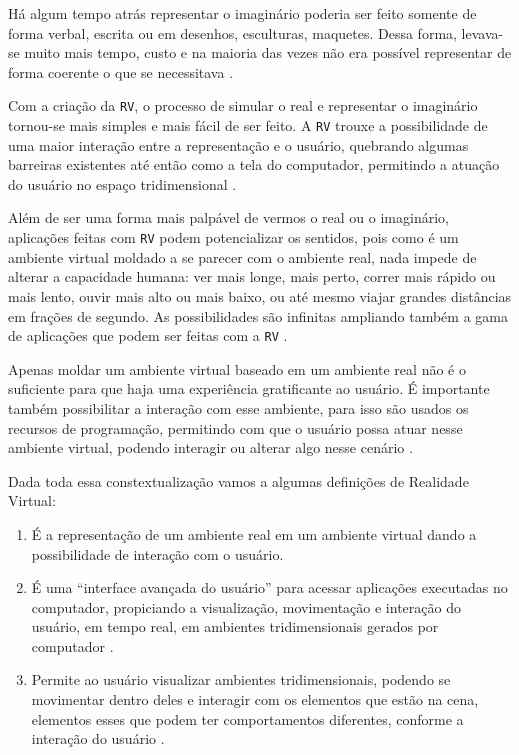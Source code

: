 Há algum tempo atrás representar o imaginário poderia ser feito somente de forma verbal, escrita ou  em
desenhos, esculturas, maquetes. Dessa forma, levava-se muito mais tempo, custo e na maioria das vezes não era
possível representar de forma coerente o que se necessitava \cite{kirner2006}.

Com a criação da \verb'RV', o processo de simular o real e representar o imaginário tornou-se mais simples e
mais fácil de ser feito. A \verb'RV' trouxe a possibilidade de uma maior interação entre a representação e o
usuário, quebrando algumas barreiras existentes até então como a tela do computador, permitindo a atuação do
usuário no espaço tridimensional \cite{kirner2006}.

Além de ser uma forma mais palpável de vermos o real ou o imaginário, aplicações feitas com \verb'RV' podem
potencializar os sentidos, pois como é um ambiente virtual moldado a se parecer com o ambiente real, nada
impede de alterar a capacidade humana: ver mais longe, mais perto, correr mais rápido ou mais lento, ouvir
mais alto ou mais baixo, ou até mesmo viajar grandes distâncias em frações de segundo. As possibilidades são
infinitas ampliando também a gama de aplicações que podem ser feitas com a \verb'RV' \cite{kirner2006}.

Apenas moldar um ambiente virtual baseado em um ambiente real não é o suficiente para que haja uma experiência
gratificante ao usuário. É importante também possibilitar a interação com esse ambiente, para isso são usados
os recursos de programação, permitindo com que o usuário possa atuar nesse ambiente virtual, podendo interagir
ou alterar algo nesse cenário \cite{kirner2006}.

Dada toda essa constextualização vamos a algumas definições de Realidade Virtual:
\begin{enumerate}
\item É a representação de um ambiente real em um ambiente virtual dando a possibilidade de interação com o usuário.
\item É uma “interface avançada do usuário” para acessar aplicações executadas no computador, propiciando a visualização, movimentação e interação do usuário, em tempo real, em ambientes tridimensionais gerados por computador \cite{kirner2006,kirner2007}.
\item Permite ao usuário visualizar ambientes tridimensionais, podendo se movimentar dentro deles e interagir com os elementos que estão na cena, elementos esses que podem ter comportamentos diferentes, conforme a interação do usuário \cite{kirner2006}.
\end{enumerate}

